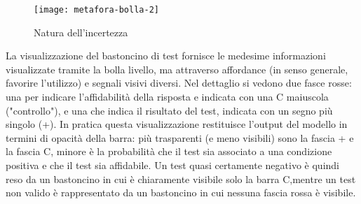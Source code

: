 \begin{figure}[!ht] 
    \centering 
    \texttt{[image: metafora-bolla-2]} 
    \caption{Natura dell'incertezza}
\end{figure}

La visualizzazione del bastoncino di test fornisce le medesime informazioni visualizzate tramite la bolla livello, ma attraverso affordance (in senso generale, favorire l'utilizzo) e segnali visivi diversi.
Nel dettaglio si vedono due fasce rosse: una per indicare l'affidabilità della risposta e indicata con
una C maiuscola ("controllo"), e una che indica il risultato del test, indicata con un segno più
singolo (+). In pratica questa visualizzazione restituisce l'output del modello in termini di opacità
della barra: più trasparenti (e meno visibili) sono la fascia + e la fascia C, minore è la probabilità
che il test sia associato a una condizione positiva e che il test sia affidabile. Un
test quasi certamente negativo è quindi reso da un bastoncino in cui è chiaramente visibile solo la
barra C,mentre un test non valido è rappresentato da un bastoncino in cui nessuna fascia rossa è
visibile.